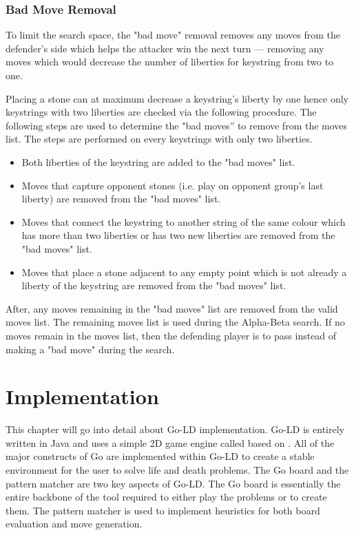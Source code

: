 \documentclass{l4proj}
\begin{document}
\subsection{Bad Move Removal}
To limit the search space, the "bad move" removal removes any moves from the defender's side which helps the attacker win the next turn — removing any moves which would decrease the number of liberties for keystring from two to one.

Placing a stone can at maximum decrease a keystring's liberty by one hence only keystrings with two liberties are checked via the following procedure. The following steps are used to determine the "bad moves” to remove from the moves list. The steps are performed on every keystrings with only two liberties.

\begin{itemize}
    \item Both liberties of the keystring are added to the "bad moves" list.
    \item Moves that capture opponent stones (i.e. play on opponent group's last liberty) are removed from the "bad moves" list.
    \item Moves that connect the keystring to another string of the same colour which has more than two liberties or has two new liberties are removed from the "bad moves" list.
    \item Moves that place a stone adjacent to any empty point which is not already a liberty of the keystring are removed from the "bad moves" list.
\end{itemize}

After, any moves remaining in the "bad moves" list are removed from the valid moves list. The remaining moves list is used during the Alpha-Beta search. If no moves remain in the moves list, then the defending player is to pass instead of making a "bad move" during the search.














\chapter{Implementation}
This chapter will go into detail about Go-LD implementation. Go-LD is entirely written in Java and uses a simple 2D game engine called  \cite{SLICK2D} based on  \cite{LWJGL}. All of the major constructs of Go are implemented within Go-LD to create a stable environment for the user to solve life and death problems.  The Go board and the pattern matcher are two key aspects of Go-LD. The Go board is essentially the entire backbone of the tool required to either play the problems or to create them. The pattern matcher is used to implement heuristics for both board evaluation and move generation.
\end{document}
